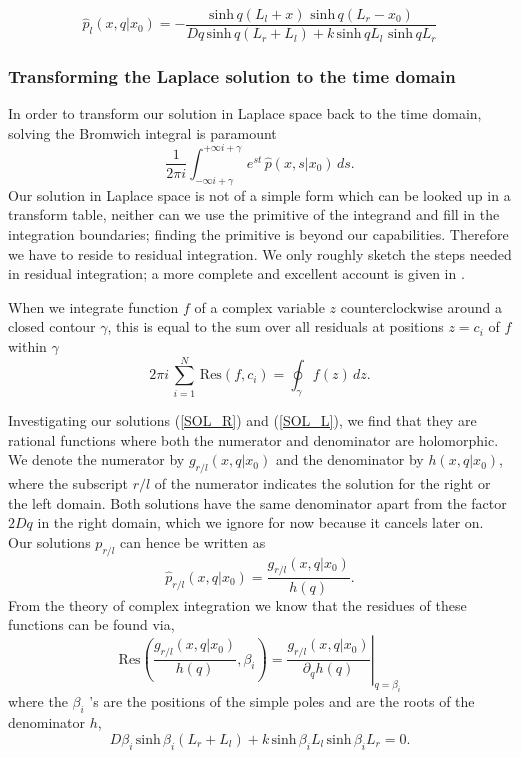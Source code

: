 \begin{equation}
 \hat{p}_l(x,q|x_0) = -\frac{\mathrm{sinh} \, q(L_l + x) \,\, \mathrm{sinh} \, q(L_r - x_0)}{Dq \, \mathrm{sinh} \, q(L_r + L_l) + k \, \mathrm{sinh} \, q L_l \,\, \mathrm{sinh} \, q L_r}
\label{SOL_L}
\end{equation}

\subsubsection{Transforming the Laplace solution to the time domain}

In order to transform our solution in Laplace space back to the time domain, solving the Bromwich integral is paramount
\begin{equation}
 \frac{1}{2 \pi i} \int_{-\infty i + \gamma}^{+\infty i + \gamma} \, e^{s t} \, \hat{p}(x,s|x_0) \, ds.
 \label{INT_I}
\end{equation}
Our solution in Laplace space is not of a simple form which can be looked up in a transform table, neither can we use the primitive of the integrand and fill in the integration boundaries; finding the primitive is beyond our capabilities. Therefore we have to reside to residual integration. We only roughly sketch the steps needed in residual integration; a more complete and excellent account is given in \cite{Bossen2011a}.

When we integrate function $f$ of a complex variable $z$ counterclockwise around a closed contour $\gamma$, this is equal to the sum over all residuals at positions $z = c_i$ of $f$ within $\gamma$
\begin{equation}
 2 \pi i\,\sum_{i=1}^{N}\,\mathrm{Res}(f,c_i) = \oint_\gamma f(z)\,dz.
 \label{RES_I}
\end{equation}

Investigating our solutions (\ref{SOL_R}) and (\ref{SOL_L}), we find that they are rational functions where both the numerator and denominator are holomorphic. We denote the numerator by $g_{r/l}(x,q|x_0)$ and the denominator by $h(x,q|x_0)$, where the subscript $r/l$ of the numerator indicates the solution for the right or the left domain. Both solutions have the same denominator apart from the factor $2 D q$ in the right domain, which we ignore for now because it cancels later on. Our solutions $p_{r/l}$ can hence be written as
\begin{equation} 
 \hat{p}_{r/l}(x,q|x_0) = \frac{g_{r/l}(x,q|x_0)}{h(q)}.
\end{equation}
From the theory of complex integration we know that the residues of these functions can be found via,
\begin{equation} 
 \mathrm{Res} \left( \frac{g_{r/l}(x,q|x_0)}{h(q)},\beta_i \right) = \left. \frac{g_{r/l}(x,q|x_0)}{\partial_q h(q)} \right|_{q = \beta_i}
 \label{RES_II}
\end{equation}
where the $\beta_i$ 's are the positions of the simple poles and are the roots of the denominator $h$,
\begin{equation} 
 D\beta_i \, \mathrm{sinh} \, \beta_i (L_r + L_l) + k \, \mathrm{sinh} \, \beta_i L_l \, \mathrm{sinh} \, \beta_i L_r = 0.
 \label{ROOT_I}
\end{equation}

